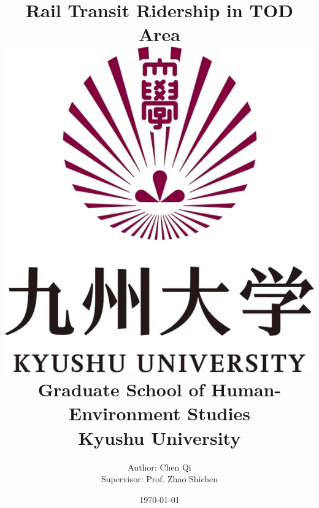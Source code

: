 \documentclass[12pt, twoside, a4paper]{book} %
\begin{document}
\title{
	{Rail Transit Ridership in TOD Area}\\
	{\vspace{3cm}}
	{\includegraphics[scale=0.2]{university.jpg}}\\
	{\vspace{2cm}}
	{\large Graduate School of Human-Environment Studies}\\
	{\large Kyushu University}
}
\author{
	{Author: Chen Qi}\\
	{Supervisor: Prof. Zhao Shichen}
	{\vspace{1cm}}
}
\date{\today}
\maketitle

\tableofcontents %
\listoffigures %
\listoftables %

\frontmatter
\setlength{\parskip}{0.5\baselineskip} %
\end{document}
